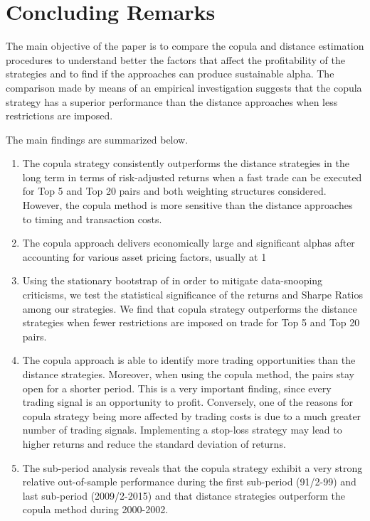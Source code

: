 \documentclass[a4paper]{article}
\begin{document}
	\section{Concluding Remarks}
	
The main objective of the paper is to compare the copula and distance estimation procedures to understand better the factors that affect the profitability of the strategies and to find if the approaches can produce sustainable alpha. The comparison made by means of an empirical investigation suggests that the copula strategy has a superior performance than the distance approaches when less restrictions are imposed.
	
The main findings are summarized below.
	
	\begin{enumerate}
		\item The copula strategy consistently outperforms the distance strategies in the long term in terms of risk-adjusted returns when a fast trade can be executed for Top 5 and Top 20 pairs and both weighting structures considered. However, the copula method is more sensitive than the distance approaches to timing and transaction costs.
		\item The copula approach delivers economically large and significant alphas after accounting for various asset pricing factors, usually at 1\\%
		\item Using the stationary bootstrap of \citet*{pr94} in order to mitigate data-snooping criticisms, we test the statistical significance of the returns and Sharpe Ratios among our strategies. We find that copula strategy outperforms the distance strategies when fewer restrictions are imposed on trade for Top 5 and Top 20 pairs.
		\item The copula approach is able to identify more trading opportunities than the distance strategies. Moreover, when using the copula method, the pairs stay open for a shorter period. This is a very important finding, since every trading signal is an opportunity to profit. Conversely, one of the reasons for copula strategy being more affected by trading costs is due to a much greater number of trading signals. Implementing a stop-loss strategy may lead to higher returns and reduce the standard
		deviation of returns.
		\item The sub-period analysis reveals that the copula strategy exhibit a very strong relative out-of-sample performance during the first sub-period (91/2-99) and last sub-period (2009/2-2015) and that distance strategies outperform the copula method during 2000-2002.
		
	\end{enumerate}
	
\end{document}
